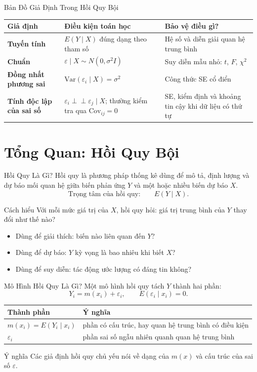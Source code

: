 \documentclass[aspectratio=169,professionalfonts]{beamer}
\newcommand{\mathnote}[1]{%
  \begin{block}{Ý nghĩa}
    #1
  \end{block}
}
\begin{document}
\begin{frame}{Bản Đồ Giả Định Trong Hồi Quy Bội}
  \small
  \begin{tabularx}{\textwidth}{@{}>{\bfseries}l>{\raggedright\arraybackslash}X>{\raggedright\arraybackslash}X@{}}
    \toprule
    Giả định & Điều kiện toán học & Bảo vệ điều gì? \\
    \midrule
    Tuyến tính & $E(Y\mid X)$ đúng dạng theo tham số & Hệ số và diễn giải quan hệ trung bình \\
    Chuẩn & $\varepsilon\mid X\sim N(0,\sigma^2I)$ & Suy diễn mẫu nhỏ: $t$, $F$, $\chi^2$ \\
    Đồng nhất phương sai & $\mathrm{Var}(\varepsilon_i\mid X)=\sigma^2$ & Công thức SE cổ điển \\
    Tính độc lập của sai số & $\varepsilon_i\perp\!\!\!\perp\varepsilon_j\mid X$; thường kiểm tra qua $\mathrm{Cov}_{ij}=0$ & SE, kiểm định và khoảng tin cậy khi dữ liệu có thứ tự \\
    \bottomrule
  \end{tabularx}
\end{frame}

\section{Tổng Quan: Hồi Quy Bội}
\begin{frame}{Hồi Quy Là Gì?}
  \small
  Hồi quy là phương pháp thống kê dùng để mô tả, định lượng và dự báo mối quan hệ giữa biến phản ứng $Y$ và một hoặc nhiều biến dự báo $X$.
  \[
    \text{Trọng tâm của hồi quy:}\qquad E(Y\mid X).
  \]
  \begin{block}{Cách hiểu}
    Với mỗi mức giá trị của $X$, hồi quy hỏi: giá trị trung bình của $Y$ thay đổi như thế nào?
  \end{block}
  \begin{itemize}
    \item Dùng để giải thích: biến nào liên quan đến $Y$?
    \item Dùng để dự báo: $Y$ kỳ vọng là bao nhiêu khi biết $X$?
    \item Dùng để suy diễn: tác động ước lượng có đáng tin không?
  \end{itemize}
\end{frame}

\begin{frame}{Mô Hình Hồi Quy Là Gì?}
  \small
  Một mô hình hồi quy tách $Y$ thành hai phần:
  \[
    Y_i = m(x_i)+\varepsilon_i,
    \qquad
    E(\varepsilon_i\mid x_i)=0.
  \]
  \begin{tabularx}{\textwidth}{@{}lX@{}}
    \toprule
    Thành phần & Ý nghĩa \\
    \midrule
    $m(x_i)=E(Y_i\mid x_i)$ & phần có cấu trúc, hay quan hệ trung bình có điều kiện \\
    $\varepsilon_i$ & phần sai số ngẫu nhiên quanh quan hệ trung bình \\
    \bottomrule
  \end{tabularx}
  \vspace{0.25cm}
  \mathnote{Các giả định hồi quy chủ yếu nói về dạng của $m(x)$ và cấu trúc của sai số $\varepsilon$.}
\end{frame}
\end{document}
